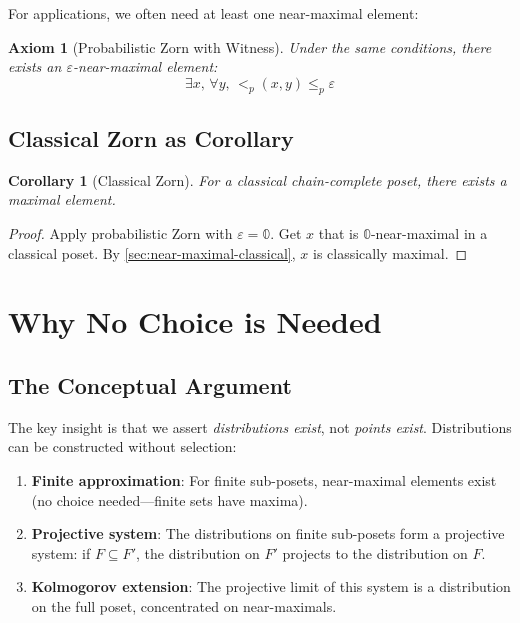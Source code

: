 \documentclass[11pt,a4paper]{article}
\newtheorem{corollary}[theorem]{Corollary}
\newtheorem{axiom}{Axiom}
\newcommand{\pzero}{\mathbb{0}}
\newcommand{\ple}{\leq_p}
\newcommand{\plt}{<_p}
\begin{document}
For applications, we often need at least one near-maximal element:

\begin{axiom}[Probabilistic Zorn with Witness]
Under the same conditions, there exists an $\varepsilon$-near-maximal element:
\[
\exists x,\, \forall y,\, \plt(x, y) \ple \varepsilon
\]
\end{axiom}

\subsection{Classical Zorn as Corollary}

\begin{corollary}[Classical Zorn]
For a classical chain-complete poset, there exists a maximal element.
\end{corollary}

\begin{proof}
Apply probabilistic Zorn with $\varepsilon = \pzero$. Get $x$ that is $\pzero$-near-maximal in a classical poset. By \cref{sec:near-maximal-classical}, $x$ is classically maximal.
\end{proof}

\section{Why No Choice is Needed}
\label{sec:why-no-choice}

\subsection{The Conceptual Argument}

The key insight is that we assert \emph{distributions exist}, not \emph{points exist}. Distributions can be constructed without selection:

\begin{enumerate}
    \item \textbf{Finite approximation}: For finite sub-posets, near-maximal elements exist (no choice needed---finite sets have maxima).

    \item \textbf{Projective system}: The distributions on finite sub-posets form a projective system: if $F \subseteq F'$, the distribution on $F'$ projects to the distribution on $F$.

    \item \textbf{Kolmogorov extension}: The projective limit of this system is a distribution on the full poset, concentrated on near-maximals.
\end{enumerate}
\end{document}
